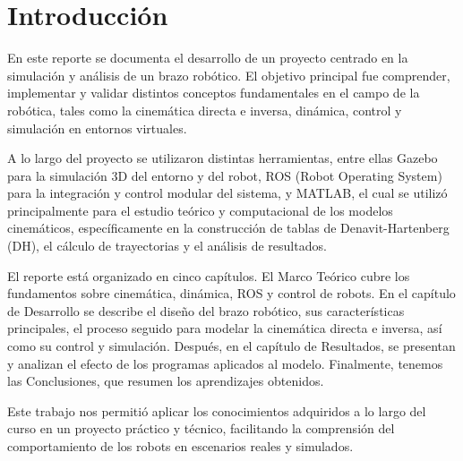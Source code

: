 \chapter{Introducción} \label{chap:introduccion}

En este reporte se documenta el desarrollo de un proyecto centrado en la simulación y análisis de un brazo robótico. El objetivo principal fue comprender, implementar y validar distintos conceptos fundamentales en el campo de la robótica, tales como la cinemática directa e inversa, dinámica, control y simulación en entornos virtuales.

A lo largo del proyecto se utilizaron distintas herramientas, entre ellas Gazebo para la simulación 3D del entorno y del robot, ROS (Robot Operating System) para la integración y control modular del sistema, y MATLAB, el cual se utilizó principalmente para el estudio teórico y computacional de los modelos cinemáticos, específicamente en la construcción de tablas de Denavit-Hartenberg (DH), el cálculo de trayectorias y el análisis de resultados.

El reporte está organizado en cinco capítulos. El Marco Teórico cubre los fundamentos sobre cinemática, dinámica, ROS y control de robots. En el capítulo de Desarrollo se describe el diseño del brazo robótico, sus características principales, el proceso seguido para modelar la cinemática directa e inversa, así como su control y simulación. Después, en el capítulo de Resultados, se presentan y analizan el efecto de los programas aplicados al modelo. Finalmente, tenemos las Conclusiones, que resumen los aprendizajes obtenidos.

Este trabajo nos permitió aplicar los conocimientos adquiridos a lo largo del curso en un proyecto práctico y técnico, facilitando la comprensión del comportamiento de los robots en escenarios reales y simulados.